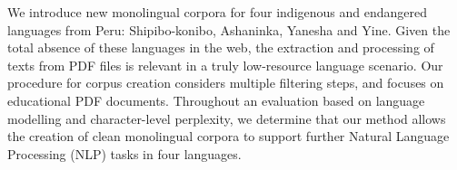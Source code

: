 We introduce new monolingual corpora for four indigenous and endangered languages from Peru: Shipibo-konibo, Ashaninka, Yanesha and Yine. Given the total absence of these languages in the web, the extraction and processing of texts from PDF files is relevant in a truly low-resource language scenario. Our procedure for corpus creation considers multiple filtering steps, and focuses on educational PDF documents. Throughout an evaluation based on language modelling and character-level perplexity, we determine that our method allows the creation of clean monolingual corpora to support further Natural Language Processing (NLP) tasks in four languages.
